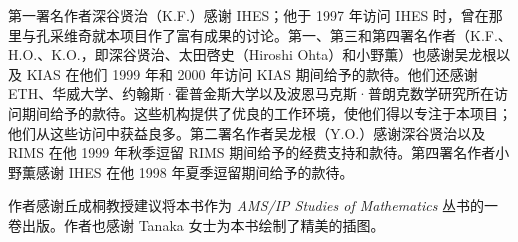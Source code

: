 第一署名作者深谷贤治（K.F.）感谢 IHES；他于 1997 年访问 IHES 时，曾在那里与孔采维奇就本项目作了富有成果的讨论。第一、第三和第四署名作者（K.F.、H.O.、K.O.，即深谷贤治、太田啓史（Hiroshi Ohta）和小野薫）也感谢吴龙根以及 KIAS 在他们 1999 年和 2000 年访问 KIAS 期间给予的款待。他们还感谢 ETH、华威大学、约翰斯·霍普金斯大学以及波恩马克斯·普朗克数学研究所在访问期间给予的款待。这些机构提供了优良的工作环境，使他们得以专注于本项目；他们从这些访问中获益良多。第二署名作者吴龙根（Y.O.）感谢深谷贤治以及 RIMS 在他 1999 年秋季逗留 RIMS 期间给予的经费支持和款待。第四署名作者小野薫感谢 IHES 在他 1998 年夏季逗留期间给予的款待。

作者感谢丘成桐教授建议将本书作为 \emph{AMS/IP Studies of Mathematics} 丛书的一卷出版。作者也感谢 Tanaka 女士为本书绘制了精美的插图。
